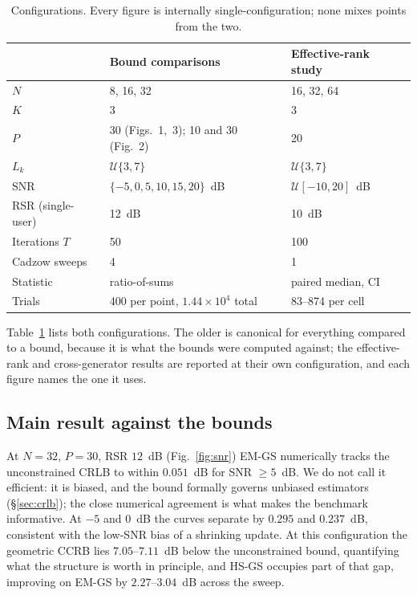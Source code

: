 \documentclass[journal]{IEEEtran}
\begin{document}
\begin{table}[!t]
\caption{Configurations. Every figure is internally single-configuration;
none mixes points from the two.}
\label{tab:params}
\centering
\small
\begin{tabular}{lll}
\toprule
 & Bound comparisons & Effective-rank study \\
\midrule
$N$ & 8, 16, 32 & 16, 32, 64 \\
$K$ & 3 & 3 \\
$P$ & 30 (Figs.~1,~3); 10 and 30 (Fig.~2) & 20 \\
$L_k$ & $\mathcal{U}\{3,7\}$~\cite{xu2025} & $\mathcal{U}\{3,7\}$~\cite{xu2025} \\
SNR & $\{-5,0,5,10,15,20\}$~dB & $\mathcal{U}[-10,20]$~dB \\
RSR (single-user) & 12~dB & 10~dB \\
Iterations $T$ & 50 & 100 \\
Cadzow sweeps & 4 & 1 \\
Statistic & ratio-of-sums & paired median, CI \\
Trials & 400 per point, $1.44\times10^4$ total & 83--874 per cell \\
\bottomrule
\end{tabular}
\end{table}

Table~\ref{tab:params} lists both configurations. The older is canonical for
everything compared to a bound, because it is what the bounds were computed
against; the effective-rank and cross-generator results are reported at their own
configuration, and each figure names the one it uses.

\subsection{Main result against the bounds}

At $N=32$, $P=30$, RSR $12$~dB (Fig.~\ref{fig:snr}) EM-GS numerically tracks
the unconstrained CRLB to within
$0.051$~dB for SNR $\ge5$~dB. We do not call it efficient: it is biased, and
the bound formally governs unbiased estimators (\S\ref{sec:crlb}); the close
numerical agreement is what makes the benchmark informative. At $-5$ and
$0$~dB the curves separate by $0.295$ and $0.237$~dB, consistent with the
low-SNR bias of a shrinking update. At this configuration the geometric CCRB
lies $7.05$--$7.11$~dB below the unconstrained bound, quantifying what the
structure is worth in principle, and HS-GS occupies part of that gap,
improving on EM-GS by $2.27$--$3.04$~dB across the sweep.
\end{document}
